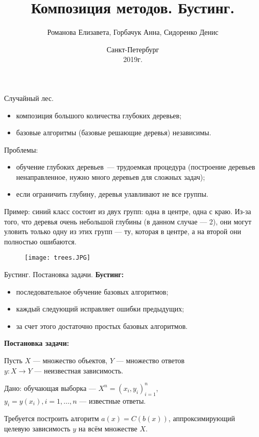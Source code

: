 \documentclass[10pt,unicode,notheorems]{beamer}
\begin{document}
\title{Композиция методов. Бустинг.}
\author{Романова Елизавета, Горбачук Анна, Сидоренко Денис}

\date{
    Санкт-Петербург\\
    2019г.
}

\begin{frame}
    \titlepage
\end{frame}

\begin{frame}{Случайный лес.}
\begin{itemize}
    \item композиция большого количества глубоких деревьев;
    \item базовые алгоритмы (базовые решающие деревья) независимы.
\end{itemize}    
Проблемы:
\begin{itemize}
    \item обучение глубоких деревьев~--- трудоемкая процедура (построение деревьев ненаправленное, нужно много деревьев для сложных задач);
    \item если ограничить глубину, деревья улавливают не все группы.
\end{itemize}    
Пример: синий класс состоит из двух групп: одна в центре, одна с краю. Из-за того, что деревья очень небольшой глубины (в данном случае — 2), они могут уловить только одну из этих групп — ту, которая в центре, а на второй они полностью ошибаются.
\begin{figure}
\texttt{[image: trees.JPG]}
\end{figure}
\end{frame}


\begin{frame}{Бустинг. Постановка задачи.}
\textbf{Бустинг:}
 \begin{itemize}
    \item последовательное обучение базовых алгоритмов;
    \item каждый следующий исправляет ошибки предыдущих;
    \item за счет этого достаточно простых базовых алгоритмов.
\end{itemize}   
\vspace{0.5cm}

\textbf{Постановка задачи:}

Пусть $X$ --- множество объектов, $Y$ --- множество ответов\\
$y: X \to Y$ --- неизвестная зависимость.

\vspace{0.2cm}
Дано: обучающая выборка --- $X^n = (x_i,y_i)_{i=1}^n $, \\
$y_i = y(x_i), i = 1,\ldots,n$ --- известные ответы.

\vspace{0.2cm}
Требуется построить алгоритм $a(x) = C(b(x))$, аппроксимирующий целевую зависимость $y$ на всём множестве $X$.
\end{frame} 
\end{document}
